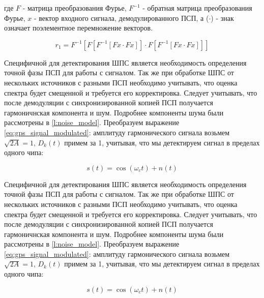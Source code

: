 где ${F}$ - матрица преобразования Фурье, ${F^{-1}}$ - обратная матрица преобразования Фурье, ${x}$ - вектор входного сигнала,
демодулированного ПСП, а (${\cdot{}}$) - знак означает поэлементное перемножение векторов.

\begin{center}
\begin{equation}
	r_1 = F^{-1} \left[ F\left[F^{-1}\left[Fx \cdot Fx\right]\right] \cdot F\left[F^{-1}\left[Fx \cdot Fx\right]\right] \right]
\end{equation}
\end{center}

Специфичной для детектирования ШПС является необходимость определения точной фазы ПСП
для работы с сигналом. Так же при обработке ШПС от нескольких источников с разными ПСП необходимо учитывать,
что оценка спектра будет смещенной и требуется его корректировка. Следует учитывать, что после демодуляции
с синхронизированной копией ПСП получается гармоничнская компонента и шум. Подробнее компоненты шума были
рассмотрены в \ref{l:noise_model}. Преобразуем выражение \ref{eq:gps_signal_modulated}: амплитуду гармонического
сигнала возьмем ${\sqrt{2A} = 1}$, ${D_k(t)}$ примем за 1, учитывая, что мы детектируем сигнал в пределах одного
чипа:
\begin{center}
\begin{equation}
	\label{eq:lpc_signal}
	s(t) = \cos(\omega_{c}t) + n(t)
\end{equation}
\end{center}

Специфичной для детектирования ШПС является необходимость определения точной фазы ПСП
для работы с сигналом. Так же при обработке ШПС от нескольких источников с разными ПСП необходимо учитывать,
что оценка спектра будет смещенной и требуется его корректировка. Следует учитывать, что после демодуляции
с синхронизированной копией ПСП получается гармоничнская компонента и шум. Подробнее компоненты шума были
рассмотрены в \ref{l:noise_model}. Преобразуем выражение \ref{eq:gps_signal_modulated}: амплитуду гармонического
сигнала возьмем ${\sqrt{2A} = 1}$, ${D_k(t)}$ примем за 1, учитывая, что мы детектируем сигнал в пределах одного
чипа:
\begin{center}
\begin{equation}
	\label{eq:lpc_signal}
	s(t) = \cos(\omega_{c}t) + n(t)
\end{equation}
\end{center}

\newpage
